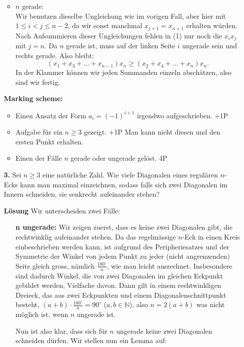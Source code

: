 \documentclass[language=german,style=solution]{smo}
\begin{document}
\begin{enumerate}
\begin{itemize}
\item $n$ gerade: \\
Wir benutzen dieselbe Ungleichung wie im vorigen Fall, aber hier mit $1 \leq i < j \leq n-2$, da wir sonst manchmal $x_{j+1} = x_{n+1}$ erhalten würden. Nach Aufsummieren dieser Ungleichungen fehlen in (1) nur noch die $x_ix_j$ mit $j = n$. Da $n$ gerade ist, muss auf der linken Seite $i$ ungerade sein und rechts gerade. Also bleibt:
\[
(x_1 + x_3 + \dots + x_{n-1})x_n \geq (x_2 + x_4 + \dots + x_n)x_n.
\]
In der Klammer können wir jeden Summanden einzeln abschätzen, also sind wir fertig.
\end{itemize}

\textbf{Marking scheme:}
\begin{itemize}
\item Einen Ansatz der Form $a_i = (-1)^{i+1}$ irgendwo aufgeschrieben. +1P
\item Aufgabe für ein $n \geq 3$ gezeigt. +1P Man kann nicht diesen und den ersten Punkt erhalten.
\item Einen der Fälle $n$ gerade oder ungerade gelöst. 4P
\end{itemize} 
\newpage

\item[\textbf{3.}] %
Sei $n\geq3$ eine natürliche Zahl. Wie viele Diagonalen eines regulären $n$-Ecks kann man maximal einzeichnen, sodass falls sich zwei Diagonalen im Innern schneiden, sie senkrecht aufeinander stehen?

\textbf{Lösung}
Wir unterscheiden zwei Fälle: 
\begin{itemize}
\item[] \textbf{n ungerade:} Wir zeigen zuerst, dass es keine zwei Diagonalen gibt, die rechtwinklig aufeinander stehen.
Da das regelmässige $n$-Eck in einen Kreis einbeschrieben werden kann, ist aufgrund des Peripheriesatzes und der Symmetrie der Winkel von jedem Punkt zu jeder (nicht angrenzenden) Seite gleich gross, nämlich $\frac{180^\circ}{n}$, wie man leicht ausrechnet. Insbesondere sind dadurch Winkel, die von zwei Diagonalen im gleichen Eckpunkt gebildet werden, Vielfache davon. Dann gilt in einem rechtwinkligen Dreieck, das aus zwei Eckpunkten und einem Diagonalenschnittpunkt besteht, $(a+b) \cdot \frac{180^\circ}{n} = 90^\circ$ ($a,b \in \mathbb{N}$), also $n = 2(a+b)$ was nicht möglich ist, wenn $n$ ungerade ist.

Nun ist also klar, dass sich für $n$ ungerade keine zwei Diagonalen schneiden dürfen. Wir stellen nun ein Lemma auf:


\end{itemize}
\end{enumerate}
\end{document}
